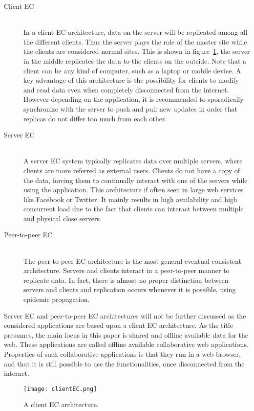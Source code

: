 \documentclass[a4paper,12pt]{report}
\begin{document}
\begin{description}
    \item[Client EC] \hfill \\ In a client EC architecture, data on the server will be replicated among all the different clients. Thus the server plays the role of the master site while the clients are considered normal sites. This is shown in figure~\ref{fig:clientEC}, the server in the middle replicates the data to the clients on the outside. Note that a client can be any kind of computer, such as a laptop or mobile device. A key advantage of this architecture is the possibility for clients to modify and read data even when completely disconnected from the internet. However depending on the application, it is recommended to sporadically synchronize with the server to push and pull new updates in order that replicas do not differ too much from each other. 
    \item[Server EC] \hfill \\ A server EC system typically replicates data over multiple servers, where clients are more referred as external users. Clients do not have a copy of the data, forcing them to continually interact with one of the servers while using the application. This architecture if often seen in large web services like Facebook or Twitter. It mainly results in high availability and high concurrent load due to the fact that clients can interact between multiple and physical close servers.
    \item[Peer-to-peer EC] \hfill \\ The peer-to-peer EC architecture is the most general eventual consistent architecture. Servers and clients interact in a peer-to-peer manner to replicate data. In fact, there is almost no proper distinction between servers and clients and replication occurs whenever it is possible, using epidemic propagation.
\end{description}

Server EC and peer-to-peer EC architectures will not be further discussed as the considered applications are based upon a client EC architecture. As the title presumes, the main focus in this paper is shared and offline available data for the web. These applications are called offline available collaborative web applications. Properties of such collaborative applications is that they run in a web browser, and that it is still possible to use the functionalities, once disconnected from the internet. 

\begin{figure}
    \vspace{-2,5cm}
    \small
    \centering
    \texttt{[image: clientEC.png]}
    \caption{A client EC architecture.}
    \label{fig:clientEC}
\end{figure}
\end{document}
